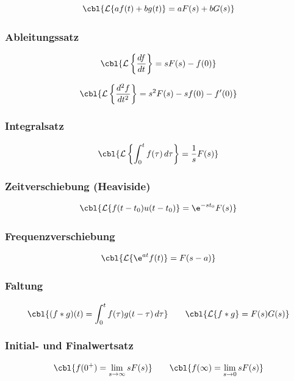 \[
\cbl{\mathcal{L}\{a f(t) + b g(t)\} = aF(s) + bG(s)}
\]

\subsubsection{Ableitungssatz}

\[
\cbl{\mathcal{L}\left\{\frac{df}{dt}\right\} = sF(s) - f(0)}
\]

\[
\cbl{\mathcal{L}\left\{\frac{d^2f}{dt^2}\right\} = s^2F(s) - s f(0) - f'(0)}
\]


\subsubsection{Integralsatz}

\[
\cbl{\mathcal{L}\left\{\int_0^t f(\tau)\,d\tau\right\} = \frac{1}{s} F(s)}
\]

\subsubsection{Zeitverschiebung (Heaviside)}

\[
\cbl{\mathcal{L}\{f(t-t_0)u(t-t_0)\} = \e^{-s t_0} F(s)}
\]

\subsubsection{Frequenzverschiebung}

\[
\cbl{\mathcal{L}\{\e^{at} f(t)\} = F(s-a)}
\]

\subsubsection{Faltung}

\[
\cbl{(f*g)(t) = \int_0^t f(\tau)g(t-\tau)\,d\tau}
\qquad
\cbl{\mathcal{L}\{f*g\} = F(s)G(s)}
\]

\subsubsection{Initial- und Finalwertsatz}

\[
\cbl{f(0^+) = \lim_{s\to\infty} sF(s)}
\qquad
\cbl{f(\infty) = \lim_{s\to 0} sF(s)}
\]


